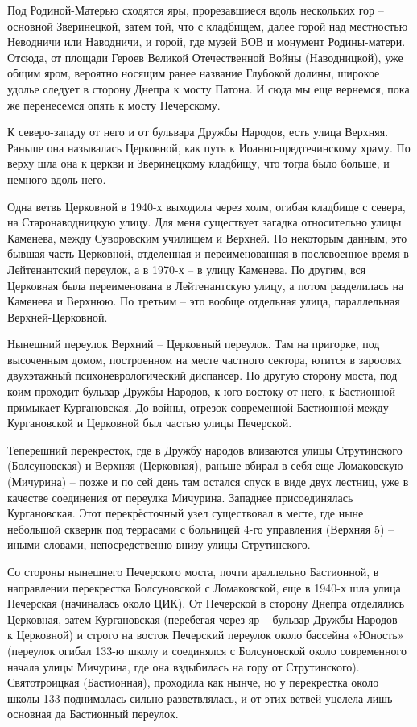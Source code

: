 Под Родиной-Матерью сходятся яры, прорезавшиеся вдоль нескольких гор – основной Зверинецкой, затем той, что с кладбищем, далее горой над местностью Неводничи или Наводничи, и горой, где музей ВОВ и монумент Родины-матери. Отсюда, от площади Героев Великой Отечественной Войны (Наводницкой), уже общим яром, вероятно носящим ранее название Глубокой долины, широкое удолье следует в сторону Днепра к мосту Патона. И сюда мы еще вернемся, пока же перенесемся опять к мосту Печерскому.

К северо-западу от него и от бульвара Дружбы Народов, есть улица Верхняя. Раньше она называлась Церковной, как путь к Иоанно-предтечинскому храму. По верху шла она к церкви и Зверинецкому кладбищу, что тогда было больше, и немного вдоль него.

Одна ветвь Церковной в 1940-х выходила через холм, огибая кладбище с севера, на Старонаводницкую улицу. Для меня существует загадка относительно улицы Каменева, между Суворовским училищем и Верхней. По некоторым данным, это бывшая часть Церковной, отделенная и переименованная в послевоенное время в Лейтенантский переулок, а в 1970-х – в улицу Каменева. По другим, вся Церковная была переименована в Лейтенантскую улицу, а потом разделилась на Каменева и Верхнюю. По третьим – это вообще отдельная улица, параллельная Верхней-Церковной.

Нынешний переулок Верхний – Церковный переулок. Там на пригорке, под высоченным домом, построенном на месте частного сектора, ютится в зарослях двухэтажный психоневрологический диспансер. По другую сторону моста, под коим проходит бульвар Дружбы Народов, к юго-востоку от него, к Бастионной примыкает Кургановская. До войны, отрезок современной Бастионной между Кургановской и Церковной был частью улицы Печерской.

Теперешний перекресток, где в Дружбу народов вливаются улицы Струтинского (Болсуновская) и Верхняя (Церковная), раньше вбирал в себя еще Ломаковскую (Мичурина) – позже и по сей день там остался спуск в виде двух лестниц, уже в качестве соединения от переулка Мичурина. Западнее присоединялась Кургановская. Этот перекрёсточный узел существовал в месте, где ныне небольшой скверик под террасами с больницей 4-го управления (Верхняя 5) – иными словами, непосредственно внизу улицы Струтинского.

Со стороны нынешнего Печерского моста,  почти араллельно Бастионной, в направлении перекрестка Болсуновской с Ломаковской,  
еще в 1940-х шла улица Печерская (начиналась около ЦИК). От Печерской в сторону Днепра отделялись Церковная, затем Кургановская (перебегая через яр – бульвар Дружбы Народов – к Церковной) и строго на восток Печерский переулок около бассейна «Юность» (переулок огибал 133-ю школу и соединялся с Болсуновской около современного начала улицы Мичурина, где она вздыбилась на гору от Струтинского). Святотроицкая (Бастионная), проходила как нынче, но у перекрестка около школы 133 поднималась сильно разветвлялась, и от этих ветвей уцелела лишь основная да Бастионный переулок.

